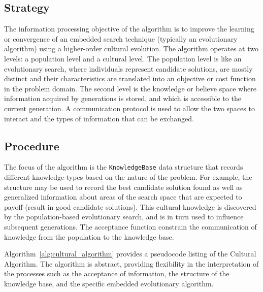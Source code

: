 \subsection{Strategy}
The information processing objective of the algorithm is to improve the learning or convergence of an embedded search technique (typically an evolutionary algorithm) using a higher-order cultural evolution. 
The algorithm operates at two levels: a population level and a cultural level. The population level is like an evolutionary search, where individuals represent candidate solutions, are mostly distinct and their characteristics are translated into an objective or cost function in the problem domain. The second level is the knowledge or believe space where information acquired by generations  is stored, and which is accessible to the current generation. A communication protocol is used to allow the two spaces to interact and the types of information that can be exchanged.

\subsection{Procedure}
The focus of the algorithm is the \texttt{Knowledge\-Base} data structure that records different knowledge types based on the nature of the problem. For example, the structure may be used to record the best candidate solution found as well as generalized information about areas of the search space that are expected to payoff (result in good candidate solutions). This cultural knowledge is discovered by the population-based evolutionary search, and is in turn used to influence subsequent generations. The acceptance function constrain the communication of knowledge from the population to the knowledge base.

Algorithm~\ref{alg:cultural_algorithm} provides a pseudocode listing of the Cultural Algorithm. The algorithm is abstract, providing flexibility in the interpretation of the processes such as the acceptance of information, the structure of the knowledge base, and the specific embedded evolutionary algorithm.


